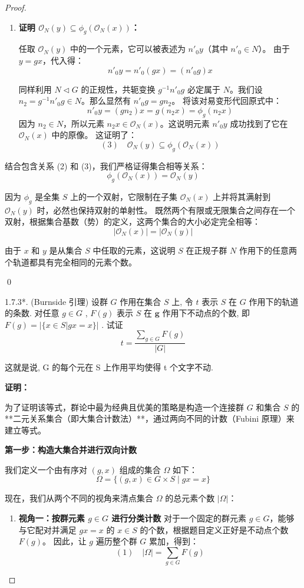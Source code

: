 \documentclass[]{article}
\begin{document}
\begin{proof}
\begin{enumerate}
	\item \textbf{证明 $\mathcal{O}_N(y) \subseteq \phi_g(\mathcal{O}_N(x))$：}
	
	任取 $\mathcal{O}_N(y)$ 中的一个元素，它可以被表述为 $n'_0 y$（其中 $n'_0 \in N$）。
	由于 $y = gx$，代入得：
	\[ n'_0 y = n'_0 (g x) = (n'_0 g) x \]
	
	同样利用 $N \triangleleft G$ 的正规性，共轭变换 $g^{-1} n'_0 g$ 必定属于 $N$。我们设 $n_2 = g^{-1} n'_0 g \in N$。那么显然有 $n'_0 g = g n_2$。
	将该对易变形代回原式中：
	\[ n'_0 y = (g n_2) x = g (n_2 x) = \phi_g(n_2 x) \]
	因为 $n_2 \in N$，所以元素 $n_2 x \in \mathcal{O}_N(x)$。这说明元素 $n'_0 y$ 成功找到了它在 $\mathcal{O}_N(x)$ 中的原像。
	这证明了：
	\[ (3) \quad \mathcal{O}_N(y) \subseteq \phi_g(\mathcal{O}_N(x)) \]
\end{enumerate}

结合包含关系 (2) 和 (3)，我们严格证得集合相等关系：
\[ \phi_g(\mathcal{O}_N(x)) = \mathcal{O}_N(y) \]

因为 $\phi_g$ 是全集 $S$ 上的一个双射，它限制在子集 $\mathcal{O}_N(x)$ 上并将其满射到 $\mathcal{O}_N(y)$ 时，必然也保持双射的单射性。
既然两个有限或无限集合之间存在一个双射，根据集合基数（势）的定义，这两个集合的大小必定完全相等：
\[ |\mathcal{O}_N(x)| = |\mathcal{O}_N(y)| \]

由于 $x$ 和 $y$ 是从集合 $S$ 中任取的元素，这说明 $S$ 在正规子群 $N$ 作用下的任意两个轨道都具有完全相同的元素个数。

\qed

1.7.3*. (Burnside 引理) 设群 $G$ 作用在集合 $S$ 上, 令 $t$ 表示 $S$ 在 $G$ 作用下的轨道的条数. 对任意 $g \in G$ , $F(g)$ 表示 $S$ 在 $\mathbf{g}$ 作用下不动点的个数, 即 $F(g) = |\{x \in S | gx = x\}|$ . 试证 $$
t = \frac {\sum_ {g \in G} F (g)}{| G |}
$$

这就是说, G 的每个元在 S 上作用平均使得 t 个文字不动. 

\bigskip
\noindent \textbf{证明：} 

为了证明该等式，群论中最为经典且优美的策略是构造一个连接群 $G$ 和集合 $S$ 的**二元关系集合（即大集合计数法）**，通过两向不同的计数（Fubini 原理）来建立等式。

\bigskip
\noindent \textbf{第一步：构造大集合并进行双向计数}

我们定义一个由有序对 $(g, x)$ 组成的集合 $\Omega$ 如下：
\[ \Omega = \{ (g, x) \in G \times S \mid gx = x \} \]

现在，我们从两个不同的视角来清点集合 $\Omega$ 的总元素个数 $|\Omega|$：

\begin{enumerate}
	\item \textbf{视角一：按群元素 $g \in G$ 进行分类计数}
	对于一个固定的群元素 $g \in G$，能够与它配对并满足 $gx = x$ 的 $x \in S$ 的个数，根据题目定义正好是不动点个数 $F(g)$。
	因此，让 $g$ 遍历整个群 $G$ 累加，得到：
	\[ (1) \quad |\Omega| = \sum_{g \in G} F(g) \]
	

\end{enumerate}
\end{proof}
\end{document}
